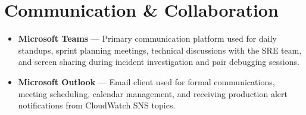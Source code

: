 \FloatBarrier

\section{Communication \& Collaboration}
\label{sec:tools_comms}


\begin{itemize}

    \item \textbf{Microsoft Teams} --- Primary communication platform
          used for daily standups, sprint planning meetings, technical
          discussions with the SRE team, and screen sharing during
          incident investigation and pair debugging sessions.

    \item \textbf{Microsoft Outlook} --- Email client used for formal
          communications, meeting scheduling, calendar management,
          and receiving production alert notifications from CloudWatch
          SNS topics.

\end{itemize}


